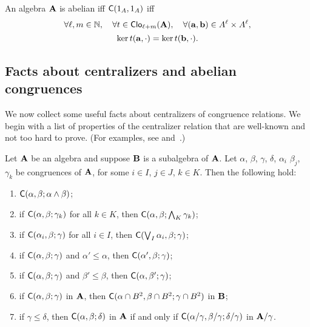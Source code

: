 \begin{rem}
  An algebra $\mathbf{A}$ is abelian iff $\mathsf{C}(1_A, 1_A)$ iff
  \[
  \forall \ell, m \in \mathbb{N},
  \quad \forall t\in \operatorname{\mathsf{Clo}}_{\ell + m}(\mathbf{A}),
  \quad \forall (\mathbf{a}, \mathbf{b})\in A^\ell\times A^\ell,
  \]
  \[
  \ker t(\mathbf{a}, \cdot)=\ker t(\mathbf{b}, \cdot).
  \]
\end{rem}

\subsection{Facts about centralizers and abelian congruences}
\label{sec:facts-about-centr}
We now collect some useful facts about centralizers of congruence relations.
We begin with a list of properties of the centralizer relation
that are well-known and not too hard to prove.
(For examples, see \cite[Prop~3.4]{HM:1988} and~\cite[Thm~2.19]{MR3076179}.)
\begin{lem}
\label{lem:centralizers}
Let $\mathbf{A}$ be an algebra and suppose
$\mathbf{B}$ is a subalgebra of $\mathbf{A}$. 
Let $\alpha$, $\beta$, $\gamma$, $\delta$, $\alpha_i$
$\beta_j$, $\gamma_k$
be congruences of $\mathbf{A}$, for some 
$i \in I$, $j\in J$, $k \in K$. Then the following hold:
\begin{enumerate}
\item \label{centralizing_over_meet}
  $\mathsf{C}(\alpha, \beta; \alpha \wedge \beta)$;
\item \label{centralizing_over_meet2}
  if $\mathsf{C}(\alpha,  \beta;  \gamma_k)$ for all $k \in K$, then
  $\mathsf{C}(\alpha,  \beta;  \bigwedge_{K}\gamma_k)$;
\item \label{centralizing_over_join1}
  if $\mathsf{C}(\alpha_i,  \beta;  \gamma)$ for all $i\in I$, then
  $\mathsf{C}(\bigvee_{I}\alpha_i,  \beta; \gamma)$;
\item \label{monotone_centralizers1}
  if $\mathsf{C}(\alpha,  \beta;  \gamma)$ and $\alpha' \leq \alpha$, then 
  $\mathsf{C}(\alpha',  \beta;  \gamma)$;
\item \label{monotone_centralizers2}
  if $\mathsf{C}(\alpha,  \beta;  \gamma)$ and $\beta' \leq \beta$, then
  $\mathsf{C}(\alpha,  \beta';  \gamma)$;
\item \label{centralizing_over_subalg}
  if $\mathsf{C}(\alpha,  \beta;  \gamma)$ in $\mathbf{A}$, 
  then $\mathsf{C}(\alpha\cap B^2,  \beta\cap B^2; \gamma\cap B^2)$ in $\mathbf{B}$;
\item \label{centralizing_factors}
  if $\gamma \leq \delta$, then $\mathsf{C}(\alpha,  \beta;  \delta)$
  in $\mathbf{A}$ if and only if $\mathsf{C}(\alpha/\gamma,  \beta/\gamma;  \delta/\gamma)$
  in $\mathbf{A}/\gamma$.
\end{enumerate}
\end{lem}


